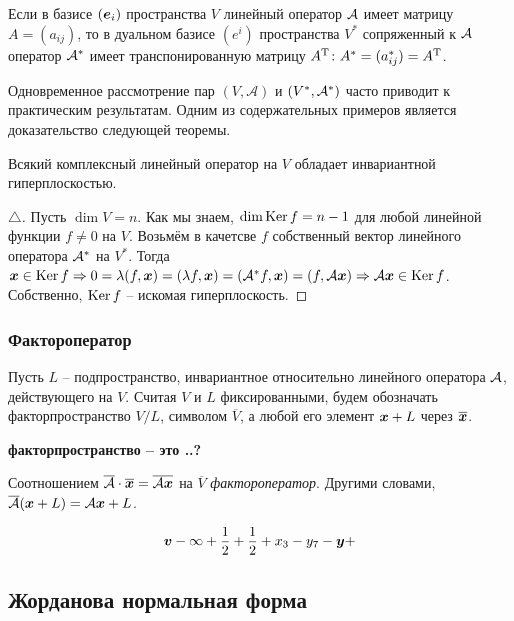 \begin{to_thr} 
    Если в базисе $(\mbox{\boldmath $e$}_i)$ пространства $V$ линейный оператор $\mathcal A$ имеет матрицу $A = (a_{ij})$, то в дуальном базисе $(e^i)$ пространства $V^*$ сопряженный к $\mathcal A$ оператор $\mathcal A^*$ имеет транспонированную матрицу $A^{\text{T}} \colon A^* = (a_{ij}^*) = A^{\text{T}}$.
\end{to_thr}

Одновременное рассмотрение пар $(V, \mathcal A)$ и $(V^*, \mathcal A^*)$ часто приводит к практическим результатам. Одним из содержательных примеров является доказательство следующей теоремы.

\begin{to_thr} 
    Всякий комплексный линейный оператор на $V$ обладает инвариантной гиперплоскостью. 
\end{to_thr}

\begin{proof}[$\triangle$]
    Пусть $\dim V =n$. Как мы знаем, $\dim \mathop{\mathrm{Ker}}\nolimits f = n - 1$ для любой линейной функции $f \neq 0$ на $V$. Возьмём в качетсве $f$ собственный вектор линейного оператора $\mathcal A^*$ на $V^*$. Тогда $\mbox{\boldmath $x$} \in \mathop{\mathrm{Ker}}\nolimits f \Rightarrow 0 = \lambda(f, \mbox{\boldmath $x$}) = (\lambda f, \mbox{\boldmath $x$}) = (\mathcal A^* f, \mbox{\boldmath $x$}) = (f, \mathcal A \mbox{\boldmath $x$}) \Rightarrow \mathcal A \mbox{\boldmath $x$} \in \mathop{\mathrm{Ker}}\nolimits f$. Собственно, $\mathop{\mathrm{Ker}}\nolimits f$ -- искомая гиперплоскость.
\end{proof}


\subsubsection{Фактороператор}

Пусть $L$ -- подпространство, инвариантное относительно линейного оператора $\mathcal A$, действующего на $V$. Считая $V$ и $L$ фиксированными, будем обозначать факторпространство $V/L$, символом $\overline{V}$, а любой его элемент $\mbox{\boldmath $x$} + L$ через $\overline{\mbox{\boldmath $x$}}$.

\textbf{факторпространство -- это ..?}

\begin{to_def} 
    Соотношением $\overline{\mathcal A} \cdot \overline{\mbox{\boldmath $x$}} = \overline{\mathcal A \mbox{\boldmath $x$}}$ на $\overline{V}$ \textit{фактороператор}. Другими словами, $\overline{\mathcal A} (\mbox{\boldmath $x$} + L) = \mathcal A \mbox{\boldmath $x$} + L$.
\end{to_def}

$$
    \mbox{\boldmath $v$} - \infty + \frac{1}{2} + \frac{1}{2} + x_{3} - y_{7} - \mbox{\boldmath $y$} + 
$$


\subsection{Жорданова нормальная форма}

